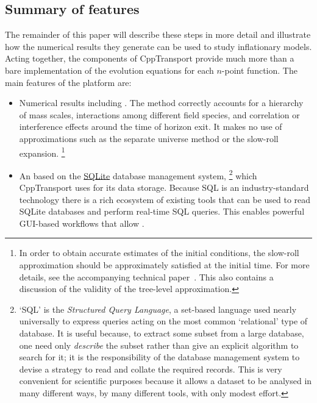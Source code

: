 \documentclass[11pt,a4paper]{article}
\newcommand{\packagefont}{\sffamily}
\newcommand{\CppTransport}{{\packagefont CppTransport}}
\newcommand{\SQLite}{{\packagefont SQLite}}
\newcommand{\semibold}[1]{{\fontseries{b}\selectfont{#1}}}
\begin{document}
\subsection{Summary of features}
The remainder of this paper will describe these steps
in more detail
and illustrate how the numerical results they generate can be
used to study inflationary models.
Acting together, the components
of {\CppTransport} provide much more than a bare implementation
of the evolution equations for each $n$-point function.
The main features of the platform are:
\begin{itemize}
    \item Numerical results including \semibold{all relevant
    field-theory effects at tree-level}.
    The method correctly accounts for
    a hierarchy of mass scales,
    interactions among different field species,
    and correlation or interference effects
    around the time of horizon exit.
    It makes no use of approximations
    such as the separate universe method or the slow-roll
    expansion.%
        \footnote{In order to obtain accurate estimates of
        the initial conditions,
        the slow-roll approximation should be
        approximately satisfied at the initial time.
        For more details, see the accompanying technical
        paper~\cite{DiasFrazerMulryneSeery}.
        This also contains a discussion of the validity
        of the tree-level approximation.}
    
    \item An \semibold{SQL-based workflow} based on
    the \href{http://sqlite.org}{\SQLite} database
    management system,%
        \footnote{`SQL' is the \emph{Structured Query Language},
        a set-based language used nearly universally
        to express queries acting on the most common `relational' type
        of database. It is useful because, to extract
        some subset from a large database, one need only \emph{describe}
        the subset rather than give an explicit algorithm to search for it;
        it is the responsibility of the database management system
        to devise a strategy to read and collate the required records.
        This is very convenient for
        scientific purposes
        because it allows a dataset to be analysed in
        many different ways, by many different tools,
        with only modest effort.}
    which
    {\CppTransport} uses for its data storage.
    Because SQL is an industry-standard technology
    there is a rich ecosystem of existing
    tools that can be used to
    read SQLite databases and perform real-time SQL queries.
    This enables powerful GUI-based workflows that allow
    \semibold{scientific exploitation and analysis without
    extensive programming}.


\end{itemize}
\end{document}

